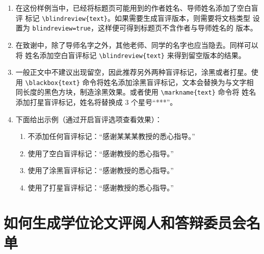 \documentclass[lang=chs, degree=phd, blindreview=false, winfonts=true]{yanputhesis}
\begin{document}
\begin{enumerate}
    \setlength{\itemsep}{0pt}
    \item 在这份样例当中，已经将标题页可能用到的作者姓名、导师姓名添加了空白盲评
          标记 \lstinline`\blindreview{text}`。如果需要生成盲评版本，则需要将文档类型
          设置为 \lstinline`blindreview=true`，这样便可得到标题页不含作者与导师姓名的
          版本。
    \item 在致谢中，除了导师名字之外，其他老师、同学的名字也应当隐去。同样可以将
          姓名添加空白盲评标记 \lstinline`\blindreview{text}` 来得到留空版本的结果。
    \item 一般正文中不建议出现留空，因此推荐另外两种盲评标记，涂黑或者打星。使用
          \lstinline`\blackbox{text}` 命令将姓名添加涂黑盲评标记，文本会替换为与文字相
          同长度的黑色方块，制造涂黑效果。或者使用 \lstinline`\markname{text}` 命令将
          姓名添加打星盲评标记，姓名将替换成 3 个星号“***”。
    \item 下面给出示例（通过开启盲评选项查看效果）：
          \begin{enumerate}
              \setlength{\itemsep}{0pt}
              \item 不添加任何盲评标记：“感谢某某某教授的悉心指导。”
              \item 使用了空白盲评标记：“感谢教授的悉心指导。”
              \item 使用了涂黑盲评标记：“感谢教授的悉心指导。”
              \item 使用了打星盲评标记：“感谢教授的悉心指导。”
          \end{enumerate}
\end{enumerate}

\section{如何生成学位论文评阅人和答辩委员会名单}
\end{document}
